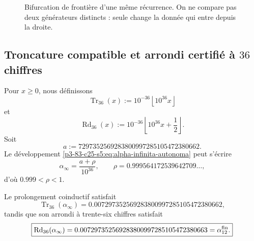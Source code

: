 \begin{figure}[htbp]
\centering
{}
\caption{Bifurcation de frontière d’une même récurrence. On ne compare pas
deux générateurs distincts : seule change la donnée qui entre depuis la
droite.}
\label{p3-83-c25-s5:fig:bifurcacion-frontera-alpha}
\end{figure}

\subsection{Troncature compatible et arrondi certifié à \(36\) chiffres}

Pour \(x\geq0\), nous définissons
\[
 \operatorname{Tr}_{36}(x)
 :=10^{-36}\left\lfloor10^{36}x\right\rfloor
\]
et
\[
 \operatorname{Rd}_{36}(x)
 :=10^{-36}\left\lfloor10^{36}x+\frac12\right\rfloor.
\]
Soit
\[
 a:=7297352569283800997285105472380662.
\]
Le développement \eqref{p3-83-c25-s5:eq:alpha-infinita-autonoma} peut s’écrire
\[
 \alpha_\infty=\frac{a+\rho}{10^{36}},
 \qquad
 \rho=0.999564172539642709\ldots,
\]
d’où \(0.999<\rho<1\).

\begin{theorem}
\label{p3-83-c25-s5:thm:frontera-alpha-662-663}
Le prolongement coinductif satisfait
\[
 \boxed{
 \operatorname{Tr}_{36}(\alpha_\infty)
 =0.007297352569283800997285105472380662,}
\]
tandis que son arrondi à trente-six chiffres satisfait
\[
 \boxed{
 \operatorname{Rd}_{36}(\alpha_\infty)
 =0.007297352569283800997285105472380663
 =\alpha_{12}^{\rm fin}.}
\]
\end{theorem}

